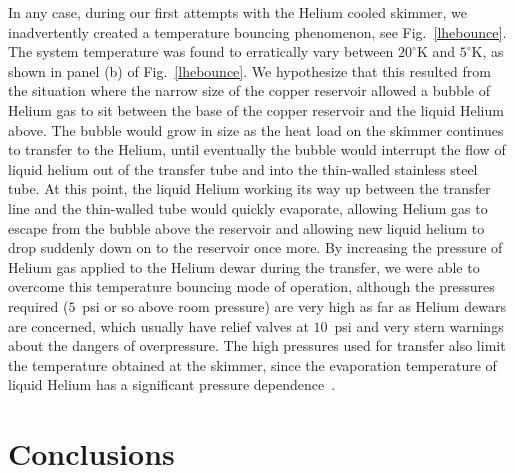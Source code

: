 
In any case, during our first attempts with the Helium cooled skimmer, we inadvertently created a temperature bouncing phenomenon, see Fig.~\ref{lhebounce}.
The system temperature was found to erratically vary between $20^\circ\!$K and $5^\circ\!$K, as shown in panel (b) of Fig.~\ref{lhebounce}.
We hypothesize that this resulted from the situation where the narrow size of the copper reservoir allowed a bubble of Helium gas to sit between the base of the copper reservoir and the liquid Helium above.
The bubble would grow in size as the heat load on the skimmer continues to transfer to the Helium, until eventually the bubble would interrupt the flow of liquid helium out of the transfer tube and into the thin-walled stainless steel tube.
At this point, the liquid Helium working its way up between the transfer line and the thin-walled tube would quickly evaporate, allowing Helium gas to escape from the bubble above the reservoir and allowing new liquid helium to drop suddenly down on to the reservoir once more.
By increasing the pressure of Helium gas applied to the Helium dewar during the transfer, we were able to overcome this temperature bouncing mode of operation, although the pressures required ($5$~psi or so above room pressure) are very high as far as Helium dewars are concerned, which usually have relief valves at $10$~psi and very stern warnings about the dangers of overpressure.
The high pressures used for transfer also limit the temperature obtained at the skimmer, since the evaporation temperature of liquid Helium has a significant pressure dependence~\citep[Sec.~A]{Jensen1980}.

\section{Conclusions}

